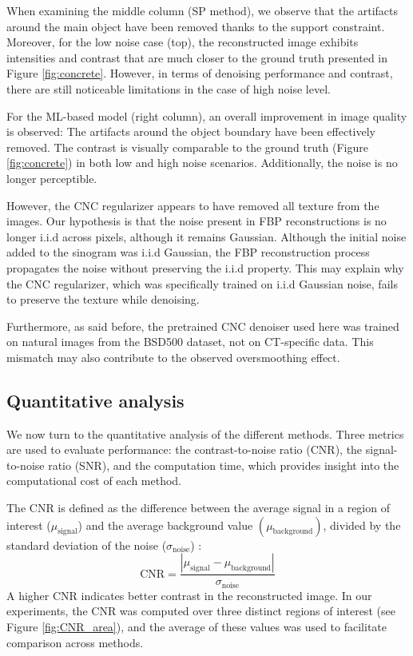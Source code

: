 \documentclass{article}
\begin{document}
 When examining the middle column (SP method), we observe that the artifacts around the main object have been removed thanks to the support constraint. Moreover, for the low noise case (top), the reconstructed image exhibits intensities and contrast that are much closer to the ground truth presented in Figure \ref{fig:concrete}.
However, in terms of denoising performance and contrast, there are still noticeable limitations in the case of high noise level. 
\medskip

For the ML-based model (right column), an overall improvement in image quality is observed: The artifacts around the object boundary have been effectively removed. The contrast is visually comparable to the ground truth (Figure \ref{fig:concrete}) in both low and high noise scenarios. Additionally, the noise is no longer perceptible.
\medskip

However, the CNC regularizer appears to have removed all texture from the images. Our hypothesis is that the noise present in FBP reconstructions is no longer i.i.d across pixels, although it remains Gaussian. Although the initial noise added to the sinogram was i.i.d Gaussian, the FBP reconstruction process propagates the noise without preserving the i.i.d property. This may explain why the CNC regularizer, which was specifically trained on i.i.d Gaussian noise, fails to preserve the texture while denoising.

Furthermore, as said before,  the pretrained CNC denoiser used here was trained on natural images from the BSD500 dataset, not on CT-specific data. This mismatch may also contribute to the observed oversmoothing effect.


\subsection{Quantitative analysis}
We now turn to the quantitative analysis of the different methods. Three metrics are used to evaluate performance: the contrast-to-noise ratio (CNR), the signal-to-noise ratio (SNR), and the computation time, which provides insight into the computational cost of each method.
\medskip

The CNR is defined as the difference between the average signal in a region of interest ($\mu_{\mathrm{signal}}$) and the average background value $(\mu_{\mathrm{background}})$, divided by the standard deviation of the noise ($\sigma_{\mathrm{noise}}$) \cite{brian_x-ray_2020}:
\begin{equation}
\mathrm{CNR} = \frac{|\mu_{\mathrm{signal}} - \mu_{\mathrm{background}}|}{\sigma_{\mathrm{noise}}}
\end{equation}
A higher CNR indicates better contrast in the reconstructed image. In our experiments, the CNR was computed over three distinct regions of interest (see Figure \ref{fig:CNR_area}), and the average of these values was used to facilitate comparison across methods.
\end{document}

